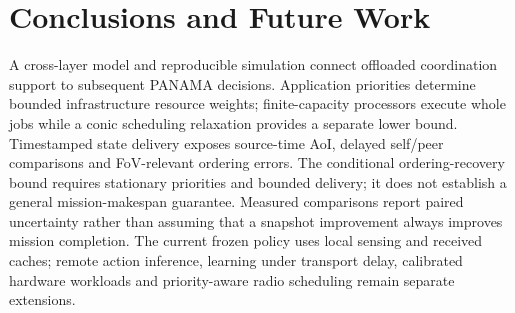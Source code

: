 \IfFileExists{IEEEtran.cls}{\documentclass[conference]{IEEEtran}}{\documentclass[10pt,twocolumn]{article}}
\begin{document}
\FloatBarrier
\section{Conclusions and Future Work}
A cross-layer model and reproducible simulation connect offloaded coordination support to subsequent PANAMA decisions. Application priorities determine bounded infrastructure resource weights; finite-capacity processors execute whole jobs while a conic scheduling relaxation provides a separate lower bound. Timestamped state delivery exposes source-time AoI, delayed self/peer comparisons and FoV-relevant ordering errors. The conditional ordering-recovery bound requires stationary priorities and bounded delivery; it does not establish a general mission-makespan guarantee. Measured comparisons report paired uncertainty rather than assuming that a snapshot improvement always improves mission completion. The current frozen policy uses local sensing and received caches; remote action inference, learning under transport delay, calibrated hardware workloads and priority-aware radio scheduling remain separate extensions.


\end{document}
